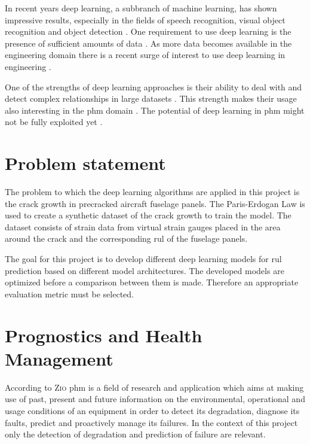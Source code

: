 \documentclass[conference]{IEEEtran}
\begin{document}
In recent years deep learning, a subbranch of machine learning, has shown impressive results, especially in the fields of speech recognition, visual object recognition and object detection \cite{LeCun2015}. One requirement to use deep learning is the presence of sufficient amounts of data \cite{Sikorska2011}. As more data becomes available in the engineering domain there is a recent surge of interest to use deep learning in engineering \cite{Voulodimos2018}.

One of the strengths of deep learning approaches is their ability to deal with and detect complex relationships in large datasets \cite{MONTEROJIMENEZ2020539}. This strength makes their usage also interesting in the \gls{phm} domain \cite{Wu2015}. The potential of deep learning in \gls{phm} might not be fully exploited yet \cite{Akrim2021}.

\section{Problem statement}
\label{sec:problem-statement}

The problem to which the deep learning algorithms are applied in this project is the crack growth in precracked aircraft fuselage panels. The Paris-Erdogan Law \cite{Paris1963} is used to create a synthetic dataset of the crack growth to train the model. The dataset consists of strain data from virtual strain gauges placed in the area around the crack and the corresponding \gls{rul} of the fuselage panels.

The goal for this project is to develop different deep learning models for \gls{rul} prediction based on different model architectures. The developed models are optimized before a comparison between them is made. Therefore an appropriate evaluation metric must be selected.

\section{Prognostics and Health Management}
\label{sec:Prognostics-and-Health-Management}

According to \textsc{Zio} \cite{Zio2012} \gls{phm} is a field of research and application which aims at making use of past, present and future information on the environmental, operational and usage conditions of an equipment in order to detect its degradation, diagnose its faults, predict and proactively manage its failures. In the context of this project only the detection of degradation and prediction of failure are relevant.
\end{document}
